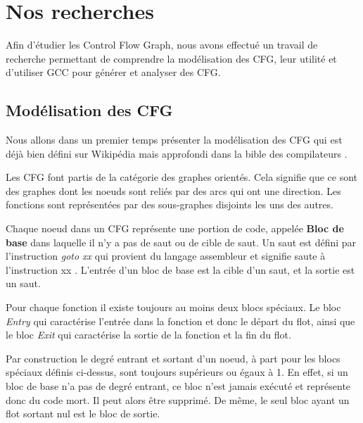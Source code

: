 \section{Nos recherches}

Afin d'étudier les Control Flow Graph, nous avons effectué un travail de recherche permettant de comprendre la modélisation des CFG, leur utilité et d'utiliser GCC pour générer et analyser des CFG. 

\subsection{Modélisation des CFG}
Nous allons dans un premier temps présenter la modélisation des CFG qui est déjà bien défini sur Wikipédia \cite{wiki:Graphe_de_flot_de_controle} mais approfondi dans la bible des compilateurs \cite{compilateurs}.

Les CFG font partis de la catégorie des graphes orientés. Cela signifie que ce sont des graphes dont les noeuds sont reliés par des arcs qui ont une direction. Les fonctions sont représentées par des sous-graphes disjoints les uns des autres.

Chaque noeud dans un CFG représente une portion de code, appelée \textbf{Bloc de base} dans laquelle il n'y a pas de saut ou de cible de saut. Un saut est défini par l'instruction \textit{goto xx} qui provient du langage assembleur et signifie \og saute à l'instruction xx \fg{}. L'entrée d'un bloc de base est la cible d'un saut, et la sortie est un saut.



Pour chaque fonction il existe toujours au moins deux blocs spéciaux. Le bloc \textit{Entry} qui caractérise l'entrée dans la fonction et donc le départ du flot, ainsi que le bloc \textit{Exit} qui caractérise la sortie de la fonction et la fin du flot.

Par construction le degré entrant et sortant d'un noeud, à part pour les blocs spéciaux définis ci-dessus, sont toujours supérieurs ou égaux à 1. En effet, si un bloc de base n'a pas de degré entrant, ce bloc n'est jamais exécuté et représente donc du code mort. Il peut alors être supprimé. De même, le seul bloc ayant un flot sortant nul est le bloc de sortie. 

